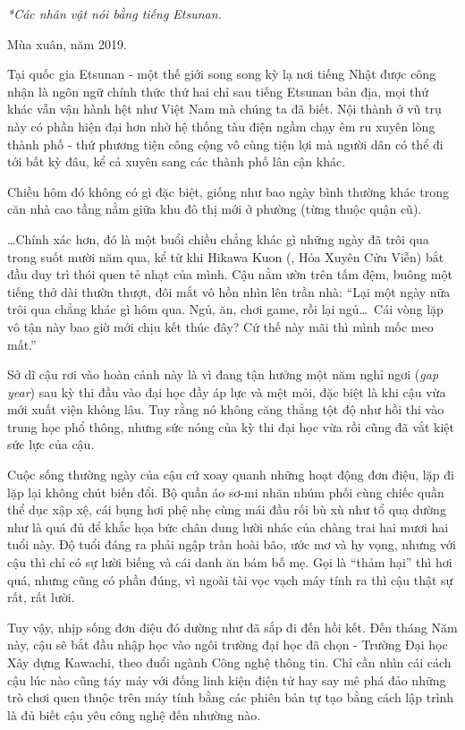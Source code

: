 \documentclass[../main.tex]{subfiles}
\begin{document}
\begin{center}
  {\textit{*Các nhân vật nói bằng tiếng Etsunan.}}
\end{center}

Mùa xuân, năm 2019.

Tại quốc gia Etsunan - một thế giới song song kỳ lạ nơi tiếng Nhật được công nhận là ngôn ngữ chính thức thứ hai chỉ sau tiếng Etsunan bản địa, mọi thứ khác vẫn vận hành hệt như Việt Nam mà chúng ta đã biết. Nội thành  ở vũ trụ này có phần hiện đại hơn nhờ hệ thống tàu điện ngầm chạy êm ru xuyên lòng thành phố - thứ phương tiện công cộng vô cùng tiện lợi mà người dân có thể đi tới bất kỳ đâu, kể cả xuyên sang các thành phố lân cận khác.

Chiều hôm đó không có gì đặc biệt, giống như bao ngày bình thường khác trong căn nhà cao tầng nằm giữa khu đô thị mới ở phường  (từng thuộc quận  cũ).

\dots Chính xác hơn, đó là một buổi chiều chẳng khác gì những ngày đã trôi qua trong suốt mười năm qua, kể từ khi Hikawa Kuon (, Hỏa Xuyên Cửu Viễn) bắt đầu duy trì thói quen tẻ nhạt của mình. Cậu nằm ườn trên tấm đệm, buông một tiếng thở dài thườn thượt, đôi mắt vô hồn nhìn lên trần nhà: ``Lại một ngày nữa trôi qua chẳng khác gì hôm qua. Ngủ, ăn, chơi game, rồi lại ngủ\dots\ Cái vòng lặp vô tận này bao giờ mới chịu kết thúc đây? Cứ thế này mãi thì mình mốc meo mất.''

Sở dĩ cậu rơi vào hoàn cảnh này là vì đang tận hưởng một năm nghỉ ngơi (\textit{gap year}) sau kỳ thi đầu vào đại học đầy áp lực và mệt mỏi, đặc biệt là khi cậu vừa mới xuất viện không lâu. Tuy rằng nó không căng thẳng tột độ như hồi thi vào trung học phổ thông, nhưng sức nóng của kỳ thi đại học vừa rồi cũng đã vắt kiệt sức lực của cậu.

Cuộc sống thường ngày của cậu cứ xoay quanh những hoạt động đơn điệu, lặp đi lặp lại không chút biến đổi. Bộ quần áo sơ-mi nhăn nhúm phối cùng chiếc quần thể dục xập xệ, cái bụng hơi phệ nhẹ cùng mái đầu rối bù xù như tổ quạ dường như là quá đủ để khắc họa bức chân dung lười nhác của chàng trai hai mươi hai tuổi này. Độ tuổi đáng ra phải ngập tràn hoài bão, ước mơ và hy vọng, nhưng với cậu thì chỉ có sự lười biếng và cái danh ăn bám bố mẹ. Gọi là ``thảm hại'' thì hơi quá, nhưng cũng có phần đúng, vì ngoài tài vọc vạch máy tính ra thì cậu thật sự rất, rất lười.

Tuy vậy, nhịp sống đơn điệu đó dường như đã sắp đi đến hồi kết. Đến tháng Năm này, cậu sẽ bắt đầu nhập học vào ngôi trường đại học đã chọn - Trường Đại học Xây dựng Kawachi, theo đuổi ngành Công nghệ thông tin. Chỉ cần nhìn cái cách cậu lúc nào cũng táy máy với đống linh kiện điện tử hay say mê phá đảo những trò chơi quen thuộc trên máy tính bằng các phiên bản tự tạo bằng cách lập trình là đủ biết cậu yêu công nghệ đến nhường nào.
\end{document}
